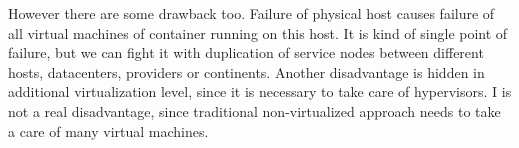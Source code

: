 
However there are some drawback too. Failure of physical host causes failure of all virtual machines of container running on this host. It is kind of single point of failure, but we can fight it with duplication of service nodes between different hosts, datacenters, providers or continents.
Another disadvantage is hidden in additional virtualization level, since it is necessary to take care of hypervisors. I is not a real disadvantage, since traditional non-virtualized approach needs to take a care of many virtual machines.

